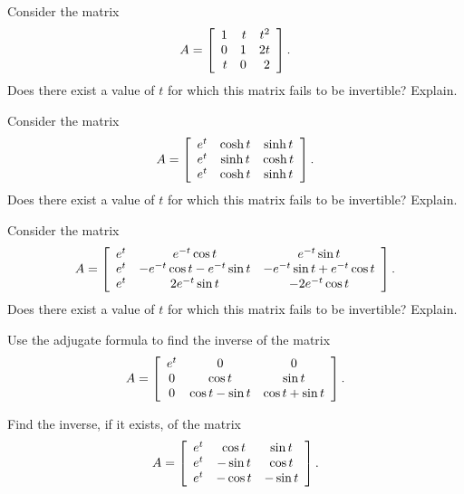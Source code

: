 \documentclass{ximera}
\begin{document}
\begin{example}
  Consider the matrix
  \begin{equation*}
    A =
    \startmat{rrr}
      1 & t & t^2 \\
      0 & 1 & 2t \\
      t & 0 & 2
    \stopmat.
  \end{equation*}
  Does there exist a value of $t$ for which this matrix fails to be
  invertible? Explain.
\end{example}

\begin{example}
  Consider the matrix
  \begin{equation*}
    A =
    \startmat{ccc}
      e^{t} & \cosh t & \sinh t \\
      e^{t} & \sinh t & \cosh t \\
      e^{t} & \cosh t & \sinh t
    \stopmat.
  \end{equation*}
  Does there exist a value of $t$ for which this matrix fails to be
  invertible? Explain.
\end{example}

\begin{example}
  Consider the matrix
  \begin{equation*}
    A =
    \startmat{ccc}
      e^{t} & e^{-t}\cos t & e^{-t}\sin t \\
      e^{t} & -e^{-t}\cos t-e^{-t}\sin t & -e^{-t}\sin t+e^{-t}\cos t \\
      e^{t} & 2e^{-t}\sin t & -2e^{-t}\cos t
    \stopmat.
  \end{equation*}
  Does there exist a value of $t$ for which this matrix fails to be
  invertible? Explain.
\end{example}

\begin{example}
  Use the adjugate formula to find the inverse of the matrix
  \begin{equation*}
    A=\startmat{ccc}
      e^{t} & 0 & 0 \\
      0 & \cos t & \sin t \\
      0 & \cos t-\sin t & \cos t+\sin t
    \stopmat.
  \end{equation*}
\end{example}

\begin{example}
  Find the inverse, if it exists, of the matrix
  \begin{equation*}
    A =
    \startmat{ccc}
      e^{t} & \cos t & \sin t \\
      e^{t} & -\sin t & \cos t \\
      e^{t} & -\cos t & -\sin t
    \stopmat.
  \end{equation*}
\end{example}
\end{document}
